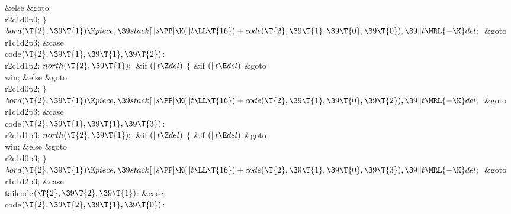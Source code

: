 \2\&{else}\1\5
\&{goto} \\{r2c1d0p0};\5
\2${}\}{}$\2\6
${}\\{bord}(\T{2},\39\T{1})\K\\{piece},\39\\{stack}[\|s\PP]\K(\|t\LL\T{16})+%
\\{code}(\T{2},\39\T{1},\39\T{0},\39\T{0}),\39\|t\MRL{-{\K}}\\{del};{}$\6
\&{goto} \\{r1c1d2p3};\6
\4\&{case} \\{code}${}(\T{2},\39\T{1},\39\T{1},\39\T{2}){}$:\5
\\{r2c1d1p2}:\5
${}\\{north}(\T{2},\39\T{1});{}$\6
\&{if} ${}(\|t\Z\\{del}){}$\5
${}\{{}$\5
\1\&{if} ${}(\|t\E\\{del}){}$\1\5
\&{goto} \\{win};\5
\2\&{else}\1\5
\&{goto} \\{r2c1d0p2};\5
\2${}\}{}$\2\6
${}\\{bord}(\T{2},\39\T{1})\K\\{piece},\39\\{stack}[\|s\PP]\K(\|t\LL\T{16})+%
\\{code}(\T{2},\39\T{1},\39\T{0},\39\T{2}),\39\|t\MRL{-{\K}}\\{del};{}$\6
\&{goto} \\{r1c1d2p3};\6
\4\&{case} \\{code}${}(\T{2},\39\T{1},\39\T{1},\39\T{3}){}$:\5
\\{r2c1d1p3}:\5
${}\\{north}(\T{2},\39\T{1});{}$\6
\&{if} ${}(\|t\Z\\{del}){}$\5
${}\{{}$\5
\1\&{if} ${}(\|t\E\\{del}){}$\1\5
\&{goto} \\{win};\5
\2\&{else}\1\5
\&{goto} \\{r2c1d0p3};\5
\2${}\}{}$\2\6
${}\\{bord}(\T{2},\39\T{1})\K\\{piece},\39\\{stack}[\|s\PP]\K(\|t\LL\T{16})+%
\\{code}(\T{2},\39\T{1},\39\T{0},\39\T{3}),\39\|t\MRL{-{\K}}\\{del};{}$\6
\&{goto} \\{r1c1d2p3};\6
\4\&{case} \\{tailcode}${}(\T{2},\39\T{2},\39\T{1}){}$:\5
\&{case} \\{code}${}(\T{2},\39\T{2},\39\T{1},\39\T{0}){}$:\5
